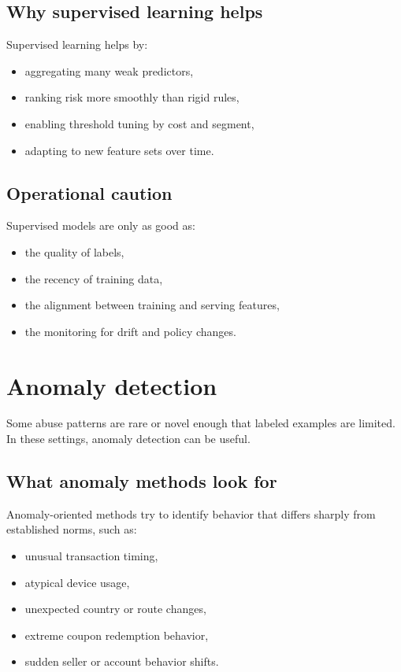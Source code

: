 \subsection{Why supervised learning helps}
Supervised learning helps by:
\begin{itemize}
  \item aggregating many weak predictors,
  \item ranking risk more smoothly than rigid rules,
  \item enabling threshold tuning by cost and segment,
  \item adapting to new feature sets over time.
\end{itemize}

\subsection{Operational caution}
Supervised models are only as good as:
\begin{itemize}
  \item the quality of labels,
  \item the recency of training data,
  \item the alignment between training and serving features,
  \item the monitoring for drift and policy changes.
\end{itemize}

\section{Anomaly detection}
Some abuse patterns are rare or novel enough that labeled examples are limited.
In these settings, anomaly detection can be useful.

\subsection{What anomaly methods look for}
Anomaly-oriented methods try to identify behavior that differs sharply from established norms, such as:
\begin{itemize}
  \item unusual transaction timing,
  \item atypical device usage,
  \item unexpected country or route changes,
  \item extreme coupon redemption behavior,
  \item sudden seller or account behavior shifts.
\end{itemize}

